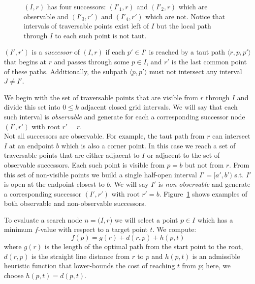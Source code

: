 \begin{figure}[tb]
  \begin{center}
    
  \end{center}
  \caption{$(I, r)$ has four successors: $(I'_1, r)$ and $(I'_2,r)$ which are observable and $(I'_3, r')$ and $(I'_4, r')$ which are not. Notice that intervals of traversable points exist left of $I$ but the local path through $I$ to each such point is not taut.}
\label{fig::successors}
\end{figure}

\begin{defi}
\label{defi::successors}
$(I', r')$ is a \emph{successor} of
$(I, r)$ if each $p' \in I'$ is reached
by a taut path $\langle r, p,  p' \rangle$ that begins
at $r$ and passes through some $p \in I$, 
and $r'$ is the last common point of these paths.  Additionally, 
the subpath $\langle p, p' \rangle$ must not intersect any 
interval $J \neq I'$.
\end{defi}
We begin with the set of traversable points that are 
visible from $r$ through $I$ and divide this set into $0 \leq k$
adjacent closed grid intervals.
We will say that each such interval is \emph{observable} and 
generate for each a corresponding successor node 
$(I', r')$ with root $r' = r$.
\\
Not all successors are observable.
For example, the taut path from $r$ can intersect 
$I$ at an endpoint $b$ which is also a corner point.
In this case we reach a set of traversable points that 
are either adjacent to $I$ or adjacent to the set of 
observable successors.
Each such point is visible from $p = b$ but not 
from $r$.  From this set of non-visible points we build a 
single half-open interval $I' = [a', b')$ s.t. $I'$ is open at the 
endpoint closest to $b$.
We will say $I'$ is \emph{non-observable} and generate a 
corresponding successor $(I', r')$ with root $r' = b$.  
Figure~\ref{fig::successors} shows examples of both
observable and non-observable successors.
%

To evaluate a search node $n = (I, r$) we will select a point $p \in I$ 
which has a minimum $f$-value with respect to a target point $t$.
We compute: 
\begin{equation}
\label{eq::f}
f(p) = g(r) + d(r, p) + h(p, t)
\end{equation}
where $g(r)$ is the length of the optimal path from the start point to 
the root, $d(r, p)$ is the straight line distance from $r$ to $p$
and $h(p, t)$ is an admissible heuristic function that lower-bounds the cost of reaching $t$ from $p$; here, we choose $h(p,t) = d(p,t)$.

